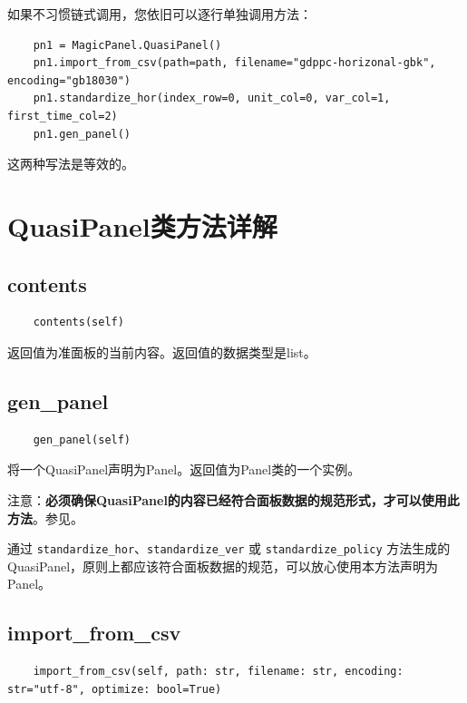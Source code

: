 \documentclass[a4paper, UTF8, fontset=none]{ctexart}
\begin{document}
    如果不习惯链式调用，您依旧可以逐行单独调用方法：

    \begin{lstlisting}
    pn1 = MagicPanel.QuasiPanel()
    pn1.import_from_csv(path=path, filename="gdppc-horizonal-gbk", encoding="gb18030")
    pn1.standardize_hor(index_row=0, unit_col=0, var_col=1, first_time_col=2)
    pn1.gen_panel()
    \end{lstlisting}

    这两种写法是等效的。

\section{QuasiPanel类方法详解}

\subsection{contents}

    \begin{lstlisting}
    contents(self)
    \end{lstlisting}

    返回值为准面板的当前内容。返回值的数据类型是list。

\subsection{gen\_panel\label{gen_panel}}

    \begin{lstlisting}
    gen_panel(self)
    \end{lstlisting}    

    将一个QuasiPanel声明为Panel。返回值为Panel类的一个实例。

    注意：\textbf{必须确保QuasiPanel的内容已经符合面板数据的规范形式，才可以使用此方法}。参见。

    通过 \verb|standardize_hor|、\verb|standardize_ver| 或 \verb|standardize_policy| 方法生成的QuasiPanel，原则上都应该符合面板数据的规范，可以放心使用本方法声明为Panel。

\subsection{import\_from\_csv}

    \begin{lstlisting}
    import_from_csv(self, path: str, filename: str, encoding: str="utf-8", optimize: bool=True)
    \end{lstlisting}    
\end{document}

